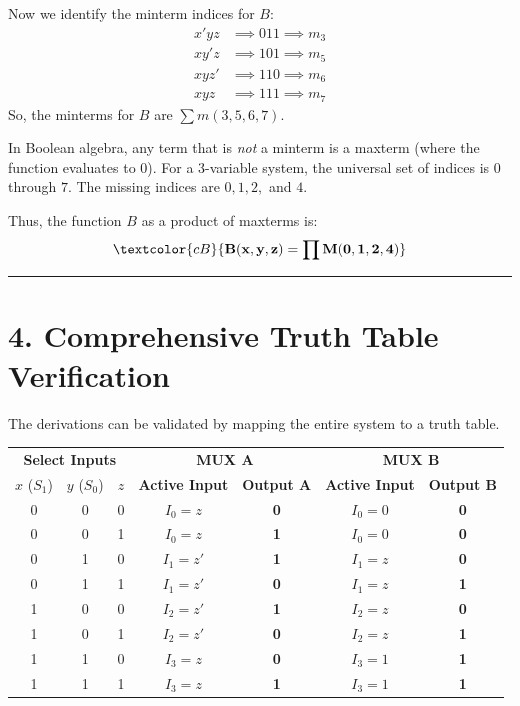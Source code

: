 \documentclass[12pt,a3paper]{article}
\begin{document}
\begin{enumerate}
\begin{tcolorbox}[enhanced,breakable,ansbox,colback=cB!4,colframe=cB,boxrule=0.8pt,arc=5pt,title={\textbf{Answer}},fonttitle=\bfseries\color{white},colbacktitle=cB]
Now we identify the minterm indices for $B$:
\begin{align*}
    x'yz  &\implies 011 \implies m_3 \\
    xy'z  &\implies 101 \implies m_5 \\
    xyz'  &\implies 110 \implies m_6 \\
    xyz   &\implies 111 \implies m_7
\end{align*}
So, the minterms for $B$ are $\sum m(3, 5, 6, 7)$. 

In Boolean algebra, any term that is \textit{not} a minterm is a maxterm (where the function evaluates to 0). For a 3-variable system, the universal set of indices is $0$ through $7$. The missing indices are $0, 1, 2,$ and $4$. 

Thus, the function $B$ as a product of maxterms is:
\begin{equation}
    \textcolor{cB}{\mathbf{B(x, y, z) = \prod M(0, 1, 2, 4)}}
\end{equation}

\vspace{0.2cm}
\hrule
\vspace{0.4cm}

\section*{4. Comprehensive Truth Table Verification}

The derivations can be validated by mapping the entire system to a truth table.

\begin{center}
\renewcommand{\arraystretch}{1.2}
\begin{tabular}{ccc | c c | c c}
    \toprule
    \multicolumn{3}{c|}{\textbf{Select Inputs}} & \multicolumn{2}{c|}{\textbf{MUX A}} & \multicolumn{2}{c}{\textbf{MUX B}} \\
    $x$ ($S_1$) & $y$ ($S_0$) & $z$ & \textbf{Active Input} & \textbf{Output A} & \textbf{Active Input} & \textbf{Output B} \\
    \midrule
    0 & 0 & 0 & $I_0 = z$  & \textbf{0} & $I_0 = 0$ & \textbf{0} \\
    0 & 0 & 1 & $I_0 = z$  & \textbf{1} & $I_0 = 0$ & \textbf{0} \\
    0 & 1 & 0 & $I_1 = z'$ & \textbf{1} & $I_1 = z$ & \textbf{0} \\
    0 & 1 & 1 & $I_1 = z'$ & \textbf{0} & $I_1 = z$ & \textbf{1} \\
    1 & 0 & 0 & $I_2 = z'$ & \textbf{1} & $I_2 = z$ & \textbf{0} \\
    1 & 0 & 1 & $I_2 = z'$ & \textbf{0} & $I_2 = z$ & \textbf{1} \\
    1 & 1 & 0 & $I_3 = z$  & \textbf{0} & $I_3 = 1$ & \textbf{1} \\
    1 & 1 & 1 & $I_3 = z$  & \textbf{1} & $I_3 = 1$ & \textbf{1} \\
    \bottomrule
\end{tabular}
\end{center}


\end{tcolorbox}
\end{enumerate}
\end{document}
